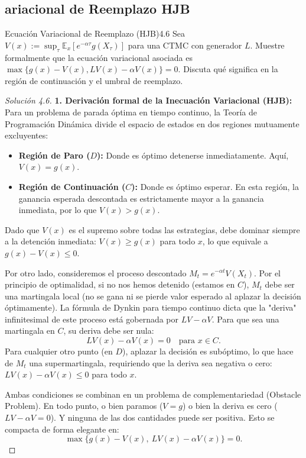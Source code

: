 \documentclass[10pt,a4paper]{article}
\begin{document}
\newpage
\subsection{ariacional de Reemplazo HJB}

\begin{ejercicio}{Ecuación Variacional de Reemplazo (HJB)}{4.6}
    Sea $V(x) := \sup_\tau \mathbb{E}_x[e^{-\alpha \tau} g(X_\tau)]$ para una CTMC con generador $L$. Muestre formalmente que la ecuación variacional asociada es $\max\{g(x) - V(x), LV(x) - \alpha V(x)\} = 0$. Discuta qué significa en la región de continuación y el umbral de reemplazo.
\end{ejercicio}

\begin{proof}[Solución 4.6]
    \textbf{1. Derivación formal de la Inecuación Variacional (HJB):}
    Para un problema de parada óptima en tiempo continuo, la Teoría de Programación Dinámica divide el espacio de estados en dos regiones mutuamente excluyentes:
    \begin{itemize}
        \item \textbf{Región de Paro ($D$):} Donde es óptimo detenerse inmediatamente. Aquí, $V(x) = g(x)$.
        \item \textbf{Región de Continuación ($C$):} Donde es óptimo esperar. En esta región, la ganancia esperada descontada es estrictamente mayor a la ganancia inmediata, por lo que $V(x) > g(x)$.
    \end{itemize}
    Dado que $V(x)$ es el supremo sobre todas las estrategias, debe dominar siempre a la detención inmediata: $V(x) \ge g(x)$ para todo $x$, lo que equivale a $g(x) - V(x) \le 0$.
    
    Por otro lado, consideremos el proceso descontado $M_t = e^{-\alpha t}V(X_t)$. Por el principio de optimalidad, si no nos hemos detenido (estamos en $C$), $M_t$ debe ser una martingala local (no se gana ni se pierde valor esperado al aplazar la decisión óptimamente). La fórmula de Dynkin para tiempo continuo dicta que la "deriva" infinitesimal de este proceso está gobernada por $LV - \alpha V$. 
    Para que sea una martingala en $C$, su deriva debe ser nula:
    \[ LV(x) - \alpha V(x) = 0 \quad \text{para } x \in C. \]
    Para cualquier otro punto (en $D$), aplazar la decisión es subóptimo, lo que hace de $M_t$ una supermartingala, requiriendo que la deriva sea negativa o cero: $LV(x) - \alpha V(x) \le 0$ para todo $x$.

    Ambas condiciones se combinan en un problema de complementariedad (Obstacle Problem). En todo punto, o bien paramos ($V=g$) o bien la deriva es cero ($LV-\alpha V = 0$). Y ninguna de las dos cantidades puede ser positiva. Esto se compacta de forma elegante en:
    \[ \max \{ g(x) - V(x), \ LV(x) - \alpha V(x) \} = 0. \]


\end{proof}
\end{document}
